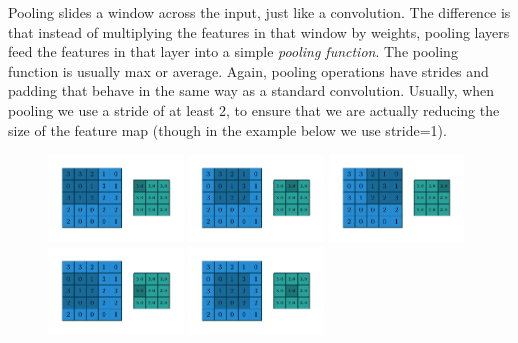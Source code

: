 \documentclass{article}
\begin{document}
Pooling slides a window across the input, just like a convolution. 
The difference is that instead of multiplying the features in that window by weights, pooling layers feed the features in that layer into a simple \textit{pooling function}. 
The pooling function is usually max or average.
Again, pooling operations have strides and padding that behave in the same way as a standard convolution.
Usually, when pooling we use a stride of at least 2, to ensure that we are actually reducing the size of the feature map (though in the example below we use stride=1).
\begin{figure}[H]
    \centering
    \includegraphics[width=0.32\textwidth]{pdf/numerical_max_pooling_00.pdf}
    \includegraphics[width=0.32\textwidth]{pdf/numerical_max_pooling_01.pdf}
    \includegraphics[width=0.32\textwidth]{pdf/numerical_max_pooling_02.pdf}
    \includegraphics[width=0.32\textwidth]{pdf/numerical_max_pooling_03.pdf}
    \includegraphics[width=0.32\textwidth]{pdf/numerical_max_pooling_04.pdf}

\end{figure}
\end{document}
